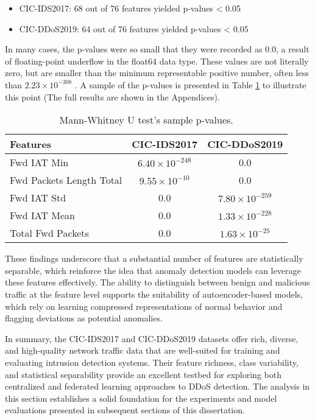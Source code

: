 \begin{itemize}
    \item CIC-IDS2017: 68 out of 76 features yielded p-values < 0.05
    \item CIC-DDoS2019: 64 out of 76 features yielded p-values < 0.05
\end{itemize}

In many cases, the p-values were so small that they were recorded as 0.0, a result of floating-point underflow in the float64 data type. These values are not literally zero, but are smaller than the minimum representable positive number, often less than $2.23 \times 10^{-308}$ \citep{w3floatnum}. A sample of the p-values is presented in Table \ref{tbl:mannwhitneyu_results} to illustrate this point (The full results are shown in the Appendices).

\begin{table}[h]
    \caption{Mann-Whitney U test’s sample p-values.}
    \centering
    \begin{tabular}{l|c|c}
        Features & CIC-IDS2017 & CIC-DDoS2019 \\
        \hline\hline
        Fwd IAT Min  & $6.40 \times 10^{-248}$ & 0.0 \\
        Fwd Packets Length Total  & $9.55 \times 10^{-10}$ & 0.0 \\
        Fwd IAT Std  & 0.0 & $7.80 \times 10^{-259}$ \\
        Fwd IAT Mean  & 0.0 & $1.33 \times 10^{-228}$ \\
        Total Fwd Packets  & 0.0 & $1.63 \times 10^{-25}$ \\
    \end{tabular}
    \label{tbl:mannwhitneyu_results}
\end{table}

These findings underscore that a substantial number of features are statistically separable, which reinforce the idea that anomaly detection models can leverage these features effectively. The ability to distinguish between benign and malicious traffic at the feature level supports the suitability of autoencoder-based models, which rely on learning compressed representations of normal behavior and flagging deviations as potential anomalies.

In summary, the CIC-IDS2017 and CIC-DDoS2019 datasets offer rich, diverse, and high-quality network traffic data that are well-suited for training and evaluating intrusion detection systems. Their feature richness, class variability, and statistical separability provide an excellent testbed for exploring both centralized and federated learning approaches to DDoS detection. The analysis in this section establishes a solid foundation for the experiments and model evaluations presented in subsequent sections of this dissertation.

